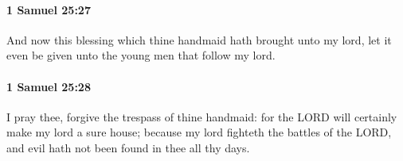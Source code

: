 		\paragraph{1 Samuel 25:27} %
			\label{1SAMUEL-25-27}

			And now this blessing which thine handmaid hath brought unto my lord, let it even be given unto the young men that follow my lord.


		\paragraph{1 Samuel 25:28} %
			\label{1SAMUEL-25-28}

			I pray thee, forgive the trespass of thine handmaid: for the LORD will certainly make my lord a sure house; because my lord fighteth the battles of the LORD, and evil hath not been found in thee all thy days.


